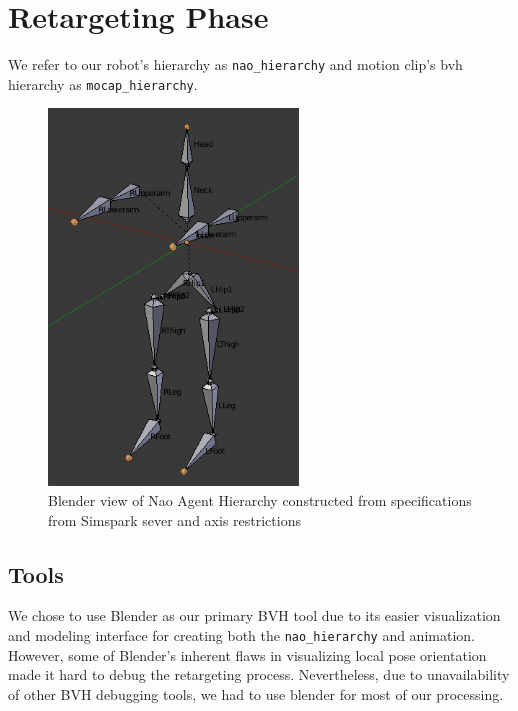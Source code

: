 \section{Retargeting Phase}
We refer to our robot's hierarchy as \texttt{nao\_hierarchy} and motion clip's bvh hierarchy as \texttt{mocap\_hierarchy}.
	


\begin{figure}[!b]
\centering
  \includegraphics[width=0.7\linewidth, height=10cm,keepaspectratio]{images/nao_hierarchy.png}
  \caption{Blender view of Nao Agent Hierarchy constructed from specifications from Simspark sever and axis restrictions}
  \label{fig:nao_hierarchy}
\end{figure}

\subsection{Tools}
We chose to use Blender as our primary BVH tool due to its easier visualization and modeling interface for creating both the \texttt{nao\_hierarchy} and animation. However, some of Blender's inherent flaws in visualizing local pose orientation made it hard to debug the retargeting process. Nevertheless, due to unavailability of other BVH debugging tools, we had to use blender for most of our processing.

